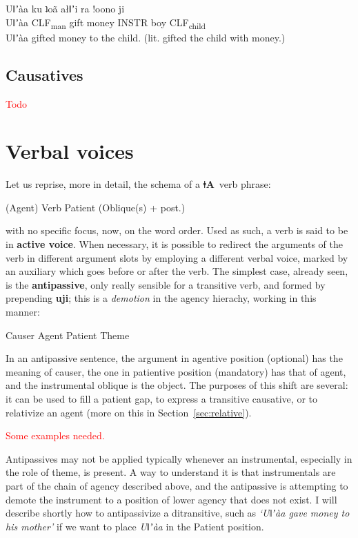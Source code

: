 \documentclass[11pt]{book}
\newcommand{\qcn}[1]{\textbf{#1}}
\newcommand{\langname}{\qcn{ǂA}~}
\newcommand{\grammsc}[1]{\textsc{#1}}
\newcommand{\CLF}[1]{\grammsc{CLF}\textsubscript{#1}}
\newcommand{\cmnt}[1]{\textcolor{red}{#1}}
\begin{document}
\begin{exe}
\ex
\gll Uǁʼàa ku ʇoã ałǁʼi ra  !oono 	ji\\
Uǁʼàa \CLF{man} gift money INSTR boy \CLF{child}\\
\glt Uǁʼàa gifted money to the child. (lit. gifted the child with money.)
\end{exe}



\subsection{Causatives}

\cmnt{Todo}

\section{Verbal voices}\label{sec:valencychanging}

Let us reprise, more in detail, the schema of a \langname verb phrase:

\begin{center}
(Agent) Verb Patient (Oblique(s) + post.)
\end{center}

with no specific focus, now, on the word order. Used as such, a verb is said to be in \textbf{active voice}. When necessary, it is possible to redirect the arguments of the verb in different argument slots by employing a different verbal voice, marked by an auxiliary which goes before or after the verb. The simplest case, already seen, is the \textbf{antipassive}, only really sensible for a transitive verb, and formed by prepending \qcn{uji}; this is a \emph{demotion} in the agency hierachy, working in this manner:

\begin{center}
	Causer \textrightarrow Agent \textrightarrow Patient \textrightarrow Theme
\end{center}

In an antipassive sentence, the argument in agentive position (optional) has the meaning of causer, the one in patientive position (mandatory) has that of agent, and the instrumental oblique is the object. The purposes of this shift are several: it can be used to fill a patient gap, to express a transitive causative, or to relativize an agent (more on this in Section~\ref{sec:relative}).

\cmnt{Some examples needed.}

Antipassives may not be applied typically whenever an instrumental, especially in the role of theme, is present. A way to understand it is that instrumentals are part of the chain of agency described above, and the antipassive is attempting to demote the instrument to a position of lower agency that does not exist. I will describe shortly how to antipassivize a ditransitive, such as \emph{`Uǁʼàa gave money to his mother'} if we want to place \emph{Uǁʼàa} in the Patient position.
\end{document}
